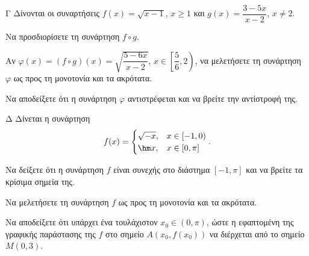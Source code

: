 \begin{thema}{Γ}
Δίνονται οι συναρτήσεις $f(x) = \sqrt{x-1}$, $x \geq 1$ και $g(x) = \dfrac{3-5x}{x-2}$, $x \neq 2$.
\begin{erwthma}
    \item Να προσδιορίσετε τη συνάρτηση $f \circ g$. 
    \item Αν $\varphi(x) = (f \circ g)(x) = \sqrt{\dfrac{5-6x}{x-2}}$, $x \in \left[\dfrac{5}{6}, 2\right)$, να μελετήσετε τη συνάρτηση $\varphi$ ως προς τη μονοτονία και τα ακρότατα. 
    \item Να αποδείξετε ότι η συνάρτηση $\varphi$ αντιστρέφεται και να βρείτε την αντίστροφή της. 
\end{erwthma}
\end{thema}
\begin{thema}{Δ}
Δίνεται η συνάρτηση
\[
f(x) = \begin{cases} \sqrt{-x}, & x \in [-1, 0) \\ \hm x, & x \in [0, \pi] \end{cases}.
\]
\begin{erwthma}
    \item Να δείξετε ότι η συνάρτηση $f$ είναι συνεχής στο διάστημα $[-1, \pi]$ και να βρείτε τα κρίσιμα σημεία της. 
    \item Να μελετήσετε τη συνάρτηση $f$ ως προς τη μονοτονία και τα ακρότατα. 
    \item Να αποδείξετε ότι υπάρχει ένα τουλάχιστον $x_0 \in (0, \pi)$, ώστε η εφαπτομένη της γραφικής παράστασης της $f$ στο σημείο $A(x_0, f(x_0))$ να διέρχεται από το σημείο $M(0, 3)$. 
\end{erwthma}
\end{thema}

